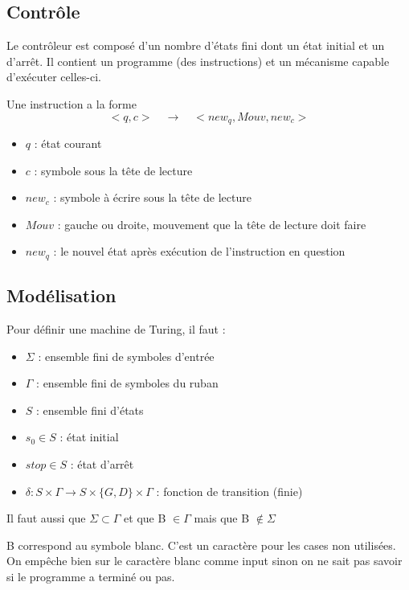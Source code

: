 \subsection{Contrôle}
\label{ssub:contr_le}
Le contrôleur est composé d'un nombre d'états fini dont un état initial et un
d'arrêt. Il contient un programme (des instructions) et un mécanisme capable d'exécuter celles-ci.

\begin{mydef} Une instruction a la forme
	$$<q,c> \quad \rightarrow \quad <new_q, Mouv, new_c>$$
	\begin{itemize}
		\item $q$ : état courant
		\item $c$ : symbole sous la tête de lecture
		\item $new_c$ : symbole à écrire sous la tête de lecture
		\item $Mouv$ : gauche ou droite, mouvement que la tête de lecture doit faire
		\item $new_q$ : le nouvel état après exécution de l'instruction en question
	\end{itemize}
\end{mydef}


\subsection{Modélisation}
Pour définir une machine de Turing, il faut :
\begin{itemize}
	\item $\Sigma$ : ensemble fini de symboles d'entrée
	\item $\Gamma$ : ensemble fini de symboles du ruban
	\item $S$ : ensemble fini d'états
	\item $s_0 \in S$ : état initial
	\item $stop \in S$ : état d'arrêt
	\item $\delta : S \times \Gamma \rightarrow S \times \{G,D\}
	\times \Gamma$ : fonction de transition (finie)
\end{itemize}
Il faut aussi que $\Sigma \subset \Gamma$ et que B $\in \Gamma$ mais que B
$\notin \Sigma$

\begin{mydef}
		B correspond au symbole blanc. C'est un caractère pour les cases non utilisées. On empêche bien sur le caractère blanc comme input sinon on ne sait pas savoir si le programme a terminé ou pas.
\end{mydef}


